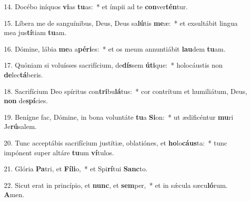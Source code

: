 14. Docébo iníquos \textbf{vi}as \textbf{tu}as:~* et ímpii ad te \textbf{con}ver\textbf{tén}tur.

15. Líbera me de sanguínibus, Deus, Deus sa\textbf{lú}tis \textbf{me}æ:~* et exsultábit lingua mea jus\textbf{tí}tiam \textbf{tu}am.

16. Dómine, lábia \textbf{me}a a\textbf{pé}\textbf{ri}es:~* et os meum annuntiábit \textbf{lau}dem \textbf{tu}am.

17. Quóniam si voluísses sacrifícium, de\textbf{dís}sem \textbf{ú}\textbf{ti}que:~* holocáustis non \textbf{de}lec\textbf{tá}beris.

18. Sacrifícium Deo spíritus con\textbf{tri}bu\textbf{lá}tus:~* cor contrítum et humiliátum, Deus, \textbf{non} de\textbf{spí}cies.

19. Benígne fac, Dómine, in bona voluntáte \textbf{tu}a \textbf{Si}on:~* ut ædificéntur \textbf{mu}ri Je\textbf{rú}salem.

20. Tunc acceptábis sacrifícium justítiæ, oblatiónes, et \textbf{ho}lo\textbf{cáus}ta:~* tunc impónent super altáre \textbf{tu}um \textbf{ví}tulos.

21. Glória \textbf{Pa}tri, et \textbf{Fí}\textbf{li}o,~* et Spi\textbf{rí}tui \textbf{Sanc}to.

22. Sicut erat in princípio, et \textbf{nunc}, et \textbf{sem}per,~* et in s\'{\ae}cula sæcu\textbf{ló}rum. \textbf{A}men.